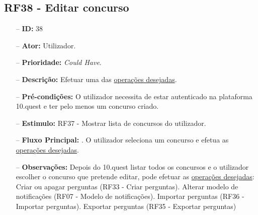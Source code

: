 \subsection{RF38 - Editar concurso}
\begin{itemize}
	\item[--] \textbf{ID:} 38
	\item[--]  \textbf{Ator:} Utilizador.
	\item[--]  \textbf{Prioridade:} \textit{Could Have}.
	\item[--]  \textbf{Descrição:} Efetuar uma das \underline{operações desejadas}.
	\item[--]  \textbf{Pré-condições:} O utilizador necessita de estar autenticado na plataforma 10.quest e ter pelo menos um concurso criado.
	\item[--]  \textbf{Estimulo:} RF37 - Mostrar lista de concursos do utilizador.
	\item[--]  \textbf{Fluxo Principal:} 
		. O utilizador seleciona um concurso e efetua as \underline{operações desejadas}.
	\item[--]  \textbf{Observações:} Depois do 10.quest listar todos os concursos e o utilizador escolher o concurso que pretende editar, pode efetuar as \underline{operações desejadas}:
		\subitem Criar ou apagar perguntas (RF33 - Criar perguntas).
		\subitem Alterar modelo de notificações (RF07 - Modelo de notificações).
		\subitem Importar perguntas (RF36 - Importar perguntas).
		\subitem Exportar perguntas (RF35 - Exportar perguntas)
\end{itemize}
\newpage

